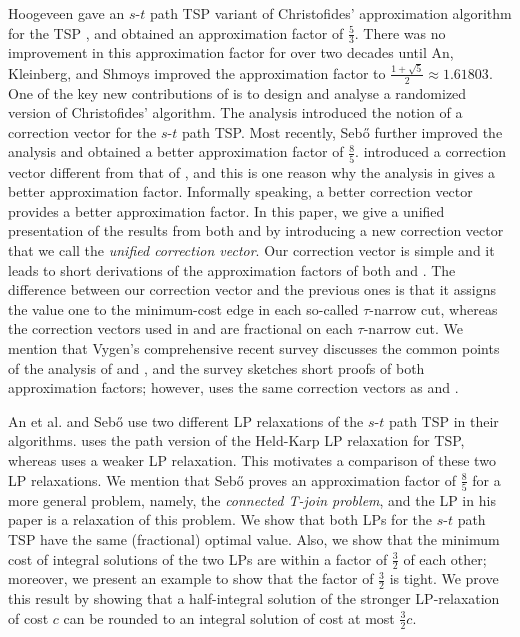 \documentclass[11pt]{article}
\begin{document}
Hoogeveen \cite{hoogeveen91} gave an $s$-$t$ path TSP variant of
Christofides' approximation algorithm for the TSP \cite{christofides76}, and obtained an approximation factor
of $\frac{5}{3}$. There was no improvement in this approximation factor
for over two decades until An, Kleinberg, and Shmoys \cite{AKS12}
improved the approximation factor to $\frac{1+\sqrt{5}}{2}\approx1.61803$.
One of the key new contributions of \cite{AKS12} is to
design and analyse a randomized version of Christofides' algorithm.
The analysis introduced the notion of a correction vector for
the $s$-$t$ path TSP.
Most recently, Seb\H{o} \cite{sebo13} further improved the
analysis and obtained a better approximation factor of $\frac{8}{5}$.
\cite{sebo13} introduced a correction vector different from that
of \cite{AKS12}, and this is one reason why the analysis in \cite{sebo13}
gives a better approximation factor. Informally speaking,
a better correction vector provides a better approximation factor.
In this paper, we give a unified presentation of the results from both
\cite{AKS12} and \cite{sebo13} by introducing a new correction vector
that we call the \emph{unified correction vector}.
Our correction vector is simple and it leads to short derivations of
the approximation factors of both \cite{AKS12} and \cite{sebo13}. The difference between our correction vector and
the previous ones is that it assigns the value one to the minimum-cost
edge in each so-called $\tau$-narrow cut, whereas the correction vectors used in \cite{AKS12} and \cite{sebo13} are fractional
on each $\tau$-narrow cut. We mention that Vygen's \cite{vygen13} comprehensive recent survey discusses
the common points of the analysis of \cite{AKS12} and \cite{sebo13},
and the survey sketches short proofs of both approximation factors;
however, \cite{vygen13} uses the same correction vectors as \cite{AKS12} and \cite{sebo13}.



An et al. \cite{AKS12} and Seb\H{o} \cite{sebo13} use two
different LP relaxations of the $s$-$t$ path TSP in their algorithms.
\cite{AKS12} uses the path version of the Held-Karp LP relaxation for TSP,
whereas \cite{sebo13} uses a weaker LP relaxation. This motivates a comparison of these two LP relaxations. We mention that Seb\H{o} proves an approximation factor of $\frac{8}{5}$ for a more
general problem, namely, the \emph{connected T-join problem}, and the LP in
his paper is a relaxation of this problem.
We show that both LPs for the $s$-$t$ path TSP have the same (fractional) optimal value.
Also, we show that the minimum cost of integral solutions of the
two LPs are within a factor of $\frac{3}{2}$ of each other; moreover,
we present an example to show that the factor of $\frac{3}{2}$ is tight.
We prove this result by showing that
a half-integral solution of the stronger LP-relaxation of cost $c$
can be rounded to an integral solution of cost at most $\frac{3}{2}c$.
\end{document}
